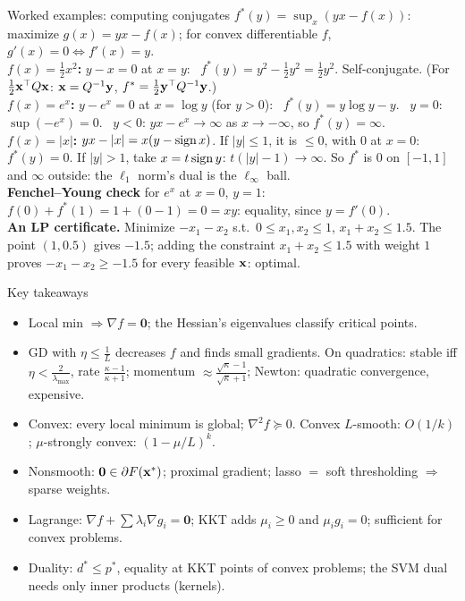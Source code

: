 \documentclass[aspectratio=1610,11pt]{beamer}
\begin{document}
\begin{frame}{Worked examples: computing conjugates}
    \small
    $f^*(y) = \sup_x(yx - f(x))$: maximize $g(x) = yx - f(x)$; for convex differentiable $f$, $g'(x) = 0 \iff f'(x) = y$.
    \\[0.4em]
    \textbf{$f(x) = \frac{1}{2}x^2$:} $y - x = 0$ at $x = y$: \ $f^*(y) = y^2 - \frac{1}{2}y^2 = \frac{1}{2}y^2$. Self-conjugate. (For $\frac{1}{2}\mathbf{x}^\top Q\mathbf{x}$: $\mathbf{x} = Q^{-1}\mathbf{y}$, $f^* = \frac{1}{2}\mathbf{y}^\top Q^{-1}\mathbf{y}$.)
    \\[0.4em]
    \textbf{$f(x) = e^x$:} $y - e^x = 0$ at $x = \log y$ (for $y > 0$): \ $f^*(y) = y\log y - y$. \ $y = 0$: $\sup(-e^x) = 0$. \ $y < 0$: $yx - e^x \to \infty$ as $x \to -\infty$, so $f^*(y) = \infty$.
    \\[0.4em]
    \textbf{$f(x) = |x|$:} $yx - |x| = x(y - \operatorname{sign} x)$. If $|y| \leq 1$, it is $\leq 0$, with $0$ at $x = 0$: $f^*(y) = 0$. If $|y| > 1$, take $x = t\operatorname{sign} y$: $t(|y| - 1) \to \infty$. So $f^*$ is $0$ on $[-1, 1]$ and $\infty$ outside: the $\ell_1$ norm's dual is the $\ell_\infty$ ball.
    \\[0.4em]
    \textbf{Fenchel--Young check} for $e^x$ at $x = 0$, $y = 1$: $f(0) + f^*(1) = 1 + (0 - 1) = 0 = xy$: equality, since $y = f'(0)$.
    \\[0.4em]
    \textbf{An LP certificate.} Minimize $-x_1 - x_2$ s.t.\ $0 \leq x_1, x_2 \leq 1$, $x_1 + x_2 \leq 1.5$. The point $(1, 0.5)$ gives $-1.5$; adding the constraint $x_1 + x_2 \leq 1.5$ with weight $1$ proves $-x_1 - x_2 \geq -1.5$ for every feasible $\mathbf{x}$: optimal.
\end{frame}

\begin{frame}{Key takeaways}
    \small
    \begin{itemize}
        \item Local min $\Rightarrow \nabla f = \mathbf{0}$; the Hessian's eigenvalues classify critical points.
        \item GD with $\eta \leq \frac{1}{L}$ decreases $f$ and finds small gradients. On quadratics: stable iff $\eta < \frac{2}{\lambda_{\max}}$, rate $\frac{\kappa - 1}{\kappa + 1}$; momentum $\approx\frac{\sqrt\kappa - 1}{\sqrt\kappa + 1}$; Newton: quadratic convergence, expensive.
        \item Convex: every local minimum is global; $\nabla^2 f \succeq 0$. Convex $L$-smooth: $O(1/k)$; $\mu$-strongly convex: $(1 - \mu/L)^k$.
        \item Nonsmooth: $\mathbf{0} \in \partial F(\mathbf{x}^*)$; proximal gradient; lasso $=$ soft thresholding $\Rightarrow$ sparse weights.
        \item Lagrange: $\nabla f + \sum\lambda_i\nabla g_i = \mathbf{0}$; KKT adds $\mu_i \geq 0$ and $\mu_ig_i = 0$; sufficient for convex problems.
        \item Duality: $d^* \leq p^*$, equality at KKT points of convex problems; the SVM dual needs only inner products (kernels).
    \end{itemize}
\end{frame}
\end{document}
